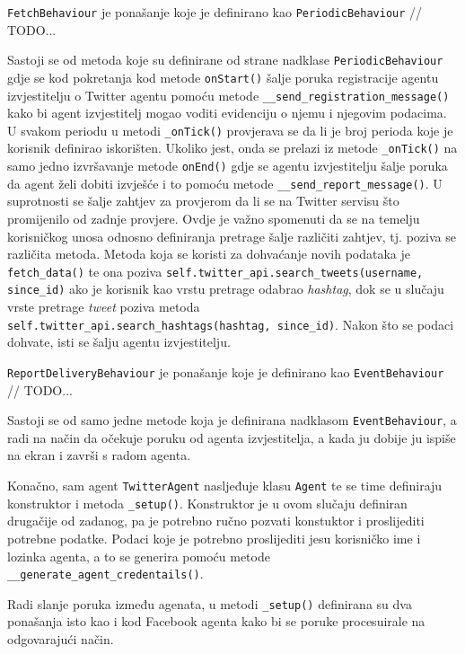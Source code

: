 \documentclass[a4paper,12pt]{foi}
\begin{document}
\texttt{FetchBehaviour} je ponašanje koje je definirano kao \texttt{PeriodicBehaviour} // TODO... 

Sastoji se od metoda koje su definirane od strane nadklase \texttt{PeriodicBehaviour} gdje se kod pokretanja kod metode \texttt{onStart()} šalje poruka registracije agentu izvjestitelju o Twitter agentu pomoću metode \texttt{\_\_send\_registration\_message()}  kako bi agent izvjestitelj mogao voditi evidenciju o njemu i njegovim podacima. U svakom periodu u metodi \texttt{\_onTick()} provjerava se da li je broj perioda koje je korisnik definirao iskorišten. Ukoliko jest, onda se prelazi iz metode \texttt{\_onTick()} na samo jedno izvršavanje metode \texttt{onEnd()} gdje se agentu izvjestitelju šalje poruka da agent želi dobiti izvješće i to pomoću metode \texttt{\_\_send\_report\_message()}. U suprotnosti se šalje zahtjev za provjerom da li se na Twitter servisu što promijenilo od zadnje provjere. Ovdje je važno spomenuti da se na temelju korisničkog unosa odnosno definiranja pretrage šalje različiti zahtjev, tj. poziva se različita metoda. Metoda koja se koristi za dohvaćanje novih podataka je \texttt{fetch\_data()} te ona poziva \texttt{self.twitter\_api.search\_tweets(username, since\_id)} ako je korisnik kao vrstu pretrage odabrao \textit{hashtag}, dok se u slučaju vrste pretrage \textit{tweet} poziva metoda \texttt{self.twitter\_api.search\_hashtags(hashtag, since\_id)}. Nakon što se podaci dohvate, isti se šalju agentu izvjestitelju.

\texttt{ReportDeliveryBehaviour} je ponašanje koje je definirano kao \texttt{EventBehaviour} // TODO... 

Sastoji se od samo jedne metode koja je definirana nadklasom \texttt{EventBehaviour}, a radi na način da očekuje poruku od agenta izvjestitelja, a kada ju dobije ju ispiše na ekran i završi s radom agenta.

Konačno, sam agent \texttt{TwitterAgent} nasljeđuje klasu \texttt{Agent} te se time definiraju konstruktor i metoda \texttt{\_setup()}. Konstruktor je u ovom slučaju definiran drugačije od zadanog, pa je potrebno ručno pozvati konstuktor i proslijediti potrebne podatke. Podaci koje je potrebno proslijediti jesu korisničko ime i lozinka agenta, a to se generira pomoću metode \texttt{\_\_generate\_agent\_credentails()}.

Radi slanje poruka između agenata, u metodi \texttt{\_setup()} definirana su dva ponašanja isto kao i kod Facebook agenta kako bi se poruke procesuirale na odgovarajući način.
\end{document}
